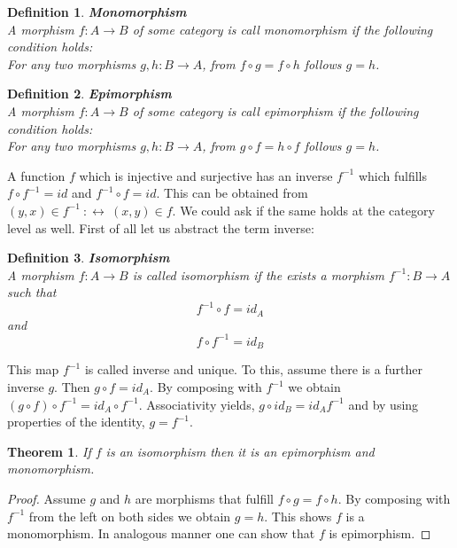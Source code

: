 \documentclass[17pt]{extarticle}
\newtheorem{theorem}{Theorem}[section]
\newtheorem{definition}{Definition}
\begin{document}
\begin{definition}
	\textbf{Monomorphism}\\
	A morphism $f:A\rightarrow B$ of some category is call monomorphism if the following condition holds:\\
	For any two morphisms $g,h:B\rightarrow A$, from $f\circ g=f\circ h$ follows $g=h$.	
\end{definition}

\begin{definition}
	\textbf{Epimorphism}\\
	A morphism $f:A\rightarrow B$ of some category is call epimorphism if the following condition holds:\\
	For any two morphisms $g,h:B\rightarrow A$, from $g\circ f=h\circ f$ follows $g=h$.	
\end{definition}

A function $f$ which is injective and surjective has an inverse $f^{-1}$ which fulfills $f\circ f^{-1}=id$ and $f^{-1}\circ f=id$. This can be obtained from $(y,x)\in f^{-1} \ :\leftrightarrow \ (x,y)\in f$. We could ask if the same holds at the category level as well.
First of all let us abstract the term inverse:

\begin{definition}
	\textbf{Isomorphism}\\
	A morphism $f:A\rightarrow B$ is called isomorphism if the exists a morphism $f^{-1}:B\rightarrow A$ such that
	$$f^{-1}\circ f=id_A$$
	and
	$$f\circ f^{-1}=id_B$$	
\end{definition}
This map $f^{-1}$ is called inverse and unique. To this, assume there is a further inverse $g$.
Then $g\circ f=id_A$. By composing with $f^{-1}$ we obtain $(g\circ f)\circ f^{-1}=id_A\circ f^{-1}$.
Associativity yields, $g\circ id_B=id_A f^{-1}$ and by using properties of the identity, $g=f^{-1}$.

\begin{theorem}
	If $f$ is an isomorphism then it is an epimorphism and monomorphism.
\end{theorem}
\begin{proof}
	Assume $g$ and $h$ are morphisms that fulfill $f\circ g=f\circ h$. By composing with $f^{-1}$ from the left on
	both sides we obtain $g=h$. This shows $f$ is a monomorphism. In analogous manner one can show that $f$
	is epimorphism.
\end{proof}
\end{document}
